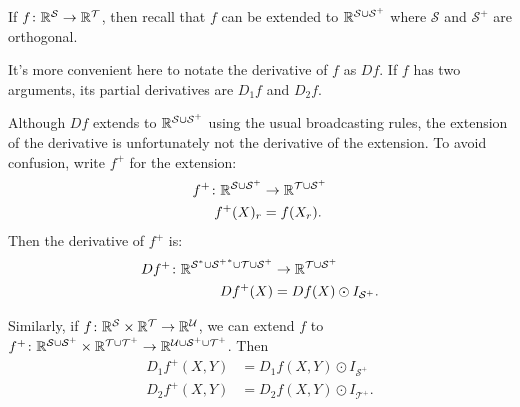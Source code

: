 If $f \colon \mathbb{R}^\mathcal{S} \rightarrow \mathbb{R}^\mathcal{T}$, then recall that $f$ can be extended to $\mathbb{R}^{\mathcal{S} \cup \mathcal{S^+}}$ where $\mathcal{S}$ and $\mathcal{S^+}$ are orthogonal.

It's more convenient here to notate the derivative of $f$ as $Df$. If $f$ has two arguments, its partial derivatives are $D_1 f$ and $D_2 f$.

Although $Df$ extends to $\mathbb{R}^{\mathcal{S} \cup \mathcal{S^+}}$ using the usual broadcasting rules, the extension of the derivative is unfortunately not the derivative of the extension. To avoid confusion, write $f^+$ for the extension:
\begin{align*}
  f^+ \colon \mathbb{R}^{\mathcal{S} \cup \mathcal{S^+}} &\rightarrow \mathbb{R}^{\mathcal{T} \cup \mathcal{S^+}} \\
  f^+(X)_r &= f(X_r).
\end{align*}
Then the derivative of $f^+$ is:
\begin{align*}
  Df^+ \colon \mathbb{R}^{\mathcal{S}^* \cup \mathcal{{S^+}}^* \cup \mathcal{T} \cup \mathcal{S^+}} &\rightarrow \mathbb{R}^{\mathcal{T} \cup \mathcal{S^+}} \\
  Df^+(X) &= Df(X) \odot I_{\mathcal{S}^+}.
\end{align*}  

Similarly, if $f \colon \mathbb{R}^\mathcal{S} \times \mathbb{R}^\mathcal{T} \rightarrow \mathbb{R}^\mathcal{U}$, we can extend $f$ to $f^+ \colon \mathbb{R}^\mathcal{S \cup S^+} \times \mathbb{R}^\mathcal{T \cup T^+} \rightarrow \mathbb{R}^\mathcal{U \cup S^+ \cup T^+}$. Then
\begin{align*}
  D_1 f^+(X, Y) &= D_1 f(X, Y) \odot I_{\mathcal{S}^+} \\
  D_2 f^+(X, Y) &= D_2 f(X, Y) \odot I_{\mathcal{T}^+}.
\end{align*}


